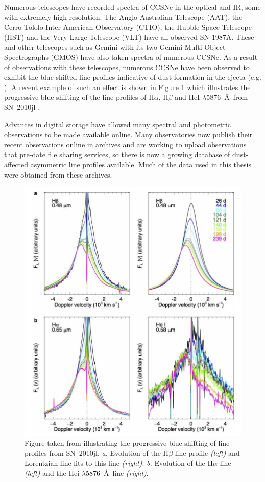 Numerous telescopes have recorded spectra of CCSNe in the optical and IR, some with extremely high resolution.  The Anglo-Australian Telescope (AAT), the Cerro Tololo Inter-American Observatory (CTIO), the Hubble Space Telescope (HST) and the Very Large Telescope (VLT) have all observed SN 1987A.  These and other telescopes such as Gemini with its two Gemini Multi-Object Spectrographs (GMOS) have also taken spectra of numerous CCSNe.  As a result of observations with these telescopes, numerous CCSNe have been observed to exhibit the blue-shifted line profiles indicative of dust formation in the ejecta (e.g. \citet{Lucy1989,Fabbri2011,Mauerhan2012,Milisavljevic2012}).  A recent example of such an effect is shown in Figure \ref{fig:2010jl} which illustrates the progressive blue-shifting of the line profiles of H$\alpha$, H$\beta$ and  HeI $\lambda$5876~\AA\ from SN~2010jl \citep{Gall2014}.

Advances in digital storage have allowed many spectral and photometric observations to be made  available online.  Many observatories now publish their recent observations online in archives and are working to upload observations that pre-date file sharing services, so there is now a growing database of dust-affected asymmetric line profiles  available. Much of the data used in this thesis were obtained from these archives.
\begin{figure}[!t]
\centering
\includegraphics[clip=true,scale=0.4,trim= 0 -20 0 -20]{chapters/chapter1/figs/2010jl.png}
\caption{Figure taken from \citet{Gall2014} illustrating the progressive blue-shifting of line profiles from SN~2010jl.  {\em a.} Evolution of the H$\beta$ line profile {\em (left)} and Lorentzian line fits to this line {\em (right)}. {\em b.} Evolution of the H$\alpha$ line {\em (left)} and the He{\sc i} $\lambda$5876~\AA\ line {\em (right)}.}
\label{fig:2010jl}
\end{figure}


